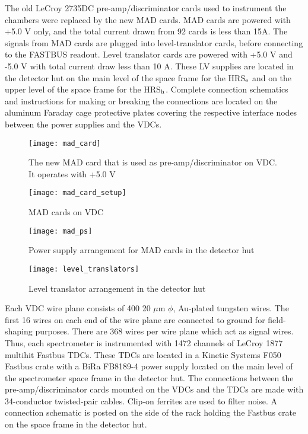 {%
The old LeCroy 2735DC pre-amp/discriminator cards used to instrument
the chambers were replaced by the new MAD cards. MAD cards are powered
with +5.0 V only, and the total current drawn from 92 cards is less
than 15A. The signals from MAD cards are plugged into level-translator
cards, before connecting to the FASTBUS readout. Level translator
cards are powered with +5.0 V and -5.0 V with total current draw less
than 10 A. 
These LV supplies are located in the detector hut on the 
main level of the space frame for the HRS$_{\rm e}$ and on the upper 
level of the space frame for the HRS$_{\rm h}$.
Complete connection schematics and instructions
for making or breaking the connections are located on the aluminum
Faraday cage protective plates covering the respective interface
nodes between the power supplies and the VDCs.

\begin{figure}[ht]
\texttt{[image: mad\_card]}
\caption{\label{fig:mad_card} The new MAD card that is used as
  pre-amp/discriminator on VDC. It operates with +5.0 V}
\end{figure}

\begin{figure}[ht]
\texttt{[image: mad\_card\_setup]}
\caption{\label{fig:mad_card_setup} MAD cards on VDC}
\end{figure}

\begin{figure}[ht]
\texttt{[image: mad\_ps]}
\caption{\label{fig:mad_ps} Power supply arrangement for MAD cards in the
  detector hut}
\end{figure}

\begin{figure}[ht]
\texttt{[image: level\_translators]}
\caption{\label{fig:lt_setup}Level translator arrangement in the detector hut}
\end{figure}

Each VDC wire plane consists of 400 20 $\mu$m $\phi$, Au-plated
tungsten wires.  The first 16 wires on each end of the wire plane
are connected to ground for field-shaping purposes.  There are
368 wires per wire plane which act as signal wires.  Thus, each
spectrometer is instrumented with 1472 channels of LeCroy 1877
multihit Fastbus TDCs.  These TDCs are located in a Kinetic Systems
F050 Fastbus crate with a BiRa FB8189-4 power supply located on the 
main level of the spectrometer space frame in
the detector hut.  The connections between the pre-amp/discriminator
cards mounted on the VDCs and the TDCs are made with 34-conductor
twisted-pair cables.  Clip-on ferrites are used to filter noise.
A connection schematic is posted on the side of the rack holding
the Fastbus crate on the space frame in the detector hut.

}
